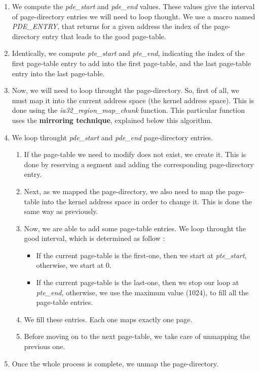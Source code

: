 \begin{enumerate}
\item We compute the \textit{pde\_start} and \textit{pde\_end}
values. These values give the interval of page-directory entries we
will need to loop thought. We use a macro named \textit{PDE\_ENTRY},
that returns for a given address the index of the page-directory entry
that leads to the good page-table.
\item Identically, we compute \textit{pte\_start} and
\textit{pte\_end}, indicating the index of the first page-table entry
to add into the first page-table, and the last page-table entry into
the last page-table.
\item Now, we will need to loop throught the page-directory. So, first
of all, we must map it into the current address space (the kernel
address space). This is done using the
\textit{ia32\_region\_map\_chunk} function. This particular function
uses the \textbf{mirroring technique}, explained below this algorithm.
\item We loop throught \textit{pde\_start} and \textit{pde\_end}
page-directory entries.
  \begin{enumerate}
  \item If the page-table we need to modify does not exist, we create
  it. This is done by reserving a segment and adding the corresponding
  page-directory entry.
  \item Next, as we mapped the page-directory, we also need to map the
  page-table into the kernel address space in order to change it. This
  is done the same way as previously.
  \item Now, we are able to add some page-table entries. We loop
  throught the good interval, which is determined as follow :
    \begin{itemize}
    \item If the current page-table is the first-one, then we start at
    \textit{pte\_start}, otherwise, we start at 0.
    \item If the current page-table is the last-one, then we stop our
    loop at \textit{pte\_end}, otherwise, we use the maximum value
    (1024), to fill all the page-table entries.
    \end{itemize}
    \item We fill these entries. Each one maps exactly one page.
    \item Before moving on to the next page-table, we take care of
    unmapping the previous one.
  \end{enumerate}
\item Once the whole process is complete, we unmap the page-directory.
\end{enumerate}



